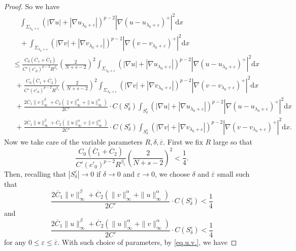\documentclass[12pt]{amsart}
\theoremstyle{definition}
\theoremstyle{remark}
\theoremstyle{conclusion}
\theoremstyle{conjecture}
\numberwithin{equation}{section}
\begin{document}
\begin{proof}
So we have
\begin{align}\label{eq.u.v.}
    &\quad \int_{\Sigma_{\lambda_0 + \varepsilon}}  (|\nabla u|+|\nabla u_{\lambda_0+\varepsilon}|)^{p-2} |\nabla(u-u_{\lambda_0+\varepsilon})^+|^2 \mathrm{d}x \\
    &\quad + \int_{\Sigma_{\lambda_0 + \varepsilon}} (|\nabla v|+|\nabla v_{\lambda_0+\varepsilon}|)^{p-2} |\nabla(v-v_{\lambda_0+\varepsilon})^+|^2 \mathrm{d}x \nonumber\\
    &\leq \frac{C_0(\overline{C}_1+\overline{C}_2)}{C'(c'_0)^{p-2}R^{\beta_1}} \left( \frac{2}{N+s-2} \right)^2 \int_{\Sigma_{\lambda_0 + \varepsilon}}\left(|\nabla u| +|\nabla u_{\lambda_0+\varepsilon}|\right)^{p-2} |\nabla(u-u_{\lambda_0+\varepsilon})^+|^2 \mathrm{d}x \nonumber\\
    &\,\,+\frac{C_0(\overline{C}_1+\overline{C}_2)}{C'(c'_0)^{p-2}R^{\beta_1}} \left( \frac{2}{N+s-2} \right)^2  \int_{\Sigma_{\lambda_0 + \varepsilon}}  (|\nabla v|+|\nabla v_{\lambda_0+\varepsilon}|)^{p-2} |\nabla(v-v_{\lambda_0+\varepsilon})^+|^2 \mathrm{d}x \nonumber\\
&\,\,+\frac{2\overline{C}_1\|v\|^\beta_{\infty}+\overline{C}_2(\|v\|^\alpha_{\infty}+\|u\|_{\infty}^\alpha)}{2C'} \cdot C(S_\delta^\varepsilon) \int_{S_\delta^\varepsilon} (|\nabla u|+|\nabla u_{\lambda_0+\varepsilon}|)^{p-2} |\nabla(u-u_{\lambda_0+\varepsilon})^+|^2 \mathrm{d}x \nonumber\\
&\,\,+\frac{2\overline{C}_1\|u\|^\beta_{\infty}+\overline{C}_2(\|u\|^\alpha_{\infty}+\|v\|_{\infty}^\alpha)}{2C'} \cdot C(S_\delta^\varepsilon) \int_{S_\delta^\varepsilon} (|\nabla v|+|\nabla v_{\lambda_0+\varepsilon}|)^{p-2} |\nabla(v-v_{\lambda_0+\varepsilon})^+|^2 \mathrm{d}x. \nonumber
\end{align}
Now we take care of the variable parameters $R, \delta, \overline{\varepsilon}$. First we fix $R$ large so that
$$\frac{C_0(\overline{C}_1+\overline{C}_2)}{C'(c'_0)^{p-2}R^{\beta_1}} \left( \frac{2}{N+s-2} \right)^2 < \frac{1}{4} .$$
Then, recalling that $|S_\delta^\varepsilon|\to 0$ if $\delta\to 0$ and $\varepsilon\to 0$, we choose $\delta$ and $\overline{\varepsilon}$ small such that
$$\frac{2\overline{C}_1\|v\|^\beta_{\infty}+\overline{C}_2(\|v\|^\alpha_{\infty}+\|u\|_{\infty}^\alpha)}{2C'} \cdot C(S_\delta^\varepsilon) <\frac{1}{4}$$
and
$$\frac{2\overline{C}_1\|u\|^\beta_{\infty}+\overline{C}_2(\|u\|^\alpha_{\infty}+\|v\|_{\infty}^\alpha)}{2C'} \cdot C(S_\delta^\varepsilon)<\frac{1}{4}$$
for any $0\leq\varepsilon\leq\overline{\varepsilon}$. With such choice of parameters, by \eqref{eq.u.v.}, we have

\end{proof}
\end{document}
